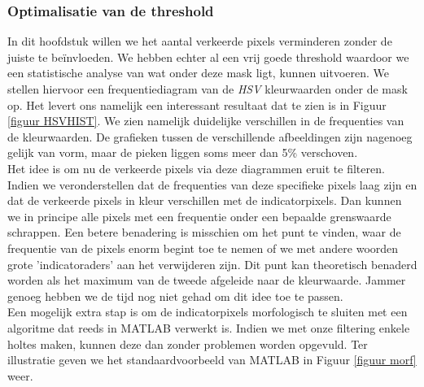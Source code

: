 \documentclass[a4paper,kulak]{kulakarticle}
\begin{document}
	\subsubsection{Optimalisatie van de threshold}
		In dit hoofdstuk willen we het aantal verkeerde pixels verminderen zonder de juiste te beïnvloeden. We hebben echter al een vrij goede threshold waardoor we een statistische analyse van wat onder deze mask ligt, kunnen uitvoeren. We stellen hiervoor een frequentiediagram van de \textit{HSV} kleurwaarden onder de mask op. Het levert ons namelijk een interessant resultaat dat te zien is in Figuur  \ref{figuur HSVHIST}. We zien namelijk duidelijke verschillen in de frequenties van de kleurwaarden. De grafieken tussen de verschillende afbeeldingen zijn nagenoeg gelijk van vorm, maar de pieken liggen soms meer dan 5\% verschoven.\\
		Het idee is om nu de verkeerde pixels via deze diagrammen eruit te filteren. Indien we veronderstellen dat de frequenties van deze specifieke pixels laag zijn en dat de verkeerde pixels in kleur verschillen met de indicatorpixels. Dan kunnen we in principe alle pixels met een frequentie onder een bepaalde grenswaarde schrappen. Een betere benadering is misschien om het punt te vinden, waar de frequentie van de pixels enorm begint toe te nemen of we met andere woorden grote 'indicatoraders' aan het verwijderen zijn. Dit punt kan theoretisch benaderd worden als het maximum van de tweede afgeleide naar de kleurwaarde. Jammer genoeg hebben we de tijd nog niet gehad om dit idee toe te passen. \\
		Een mogelijk extra stap is om de indicatorpixels morfologisch te sluiten met een algoritme dat reeds in MATLAB verwerkt is. Indien we met onze filtering enkele holtes maken, kunnen deze dan zonder problemen worden opgevuld. Ter illustratie geven we het standaardvoorbeeld van MATLAB in Figuur \ref{figuur morf} weer.
\end{document}
